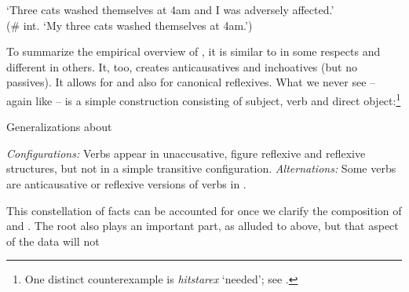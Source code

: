 \begin{exe}
\begin{xlist}
\begin{xlist}
\begin{exe}
\begin{xlist}
\begin{xlist}
\begin{exe}
\begin{xlist}
\begin{xlist}
\begin{exe}
\begin{exe}
\begin{xlist}
\begin{exe}
\begin{exe}
\begin{xlist}
\begin{exe}
\begin{exe}
\begin{exe}
\begin{exe}
\begin{exe}
\begin{xlist}
\begin{exe}
\begin{xlist}
\begin{exe}
\begin{exe}
\begin{xlist}
\begin{exe}
\begin{xlist}
\begin{exe}
\begin{xlist}
\begin{exe}
\begin{exe}
\begin{exe}
\begin{xlist}
\begin{exe}
\begin{exe}
\begin{exe}
\begin{xlist}
\begin{exe}
\begin{xlist}
\begin{exe}
\begin{xlist}
\begin{exe}
\begin{xlist}
\begin{exe}
\begin{exe}
\begin{exe}
\begin{exe}
\begin{xlist}
\begin{exe}
\begin{xlist}
\begin{exe}
\begin{xlist}
\begin{exe}
\begin{xlist}
\begin{exe}
\begin{xlist}
\begin{exe}
\begin{xlist}
\begin{exe}
\begin{exe}
\begin{exe}
\begin{exe}
\begin{xlist}
\begin{exe}
\begin{xlist}
\begin{exe}
\begin{xlist}
\begin{exe}
\begin{exe}
\begin{xlist}
\begin{exe}
\begin{xlist}
\begin{exe}
\begin{exe}
\begin{exe}
\begin{exe}
\begin{xlist}
\begin{xlist}
\begin{exe}
\begin{xlist}
\begin{exe}
\begin{exe}
\begin{exe}
\begin{xlist}
\begin{exe}
\begin{exe}
\begin{xlist}
\begin{exe}
\begin{exe}
\begin{exe}
\begin{xlist}
\begin{xlist}
\begin{exe}
\begin{xlist}
\begin{exe}
\begin{exe}
\begin{exe}
{	\glt `Three cats washed themselves at 4am and I was adversely affected.'\\
		(\# int. `My three cats washed themselves at 4am.')
	}

	
 \z 

To summarize the empirical overview of {\thit}, it is similar to {\tnif} in some respects and different in others. It, too, creates anticausatives and inchoatives (but no passives). It allows for  and also for canonical reflexives. What we never see -- again like {\tnif} -- is a simple  construction consisting of subject, verb and direct object:\footnote{One distinct counterexample is \emph{hitstarex} `needed'; see \citet[130ff16]{harveskayne12}.}

 \begin{exe}
 \ex  \label{ex:gen-thit}Generalizations about {\thit}
 \begin{xlist} 
 	\ex  \textit{Configurations:} Verbs appear in unaccusative, figure reflexive and reflexive structures, but not in a simple transitive configuration. 
 	\ex  \textit{Alternations:} Some verbs are anticausative or reflexive versions of verbs in {\tpie}. 
 \z
\z 

This constellation of facts can be accounted for once we clarify the composition of {\va} and {\vz}. The root also plays an important part, as alluded to above, but that aspect of the data will not 
\end{xlist}
\end{exe}
\end{exe}
\end{exe}
\end{exe}
\end{xlist}
\end{exe}
\end{xlist}
\end{xlist}
\end{exe}
\end{exe}
\end{exe}
\end{xlist}
\end{exe}
\end{exe}
\end{xlist}
\end{exe}
\end{exe}
\end{exe}
\end{xlist}
\end{exe}
\end{xlist}
\end{xlist}
\end{exe}
\end{exe}
\end{exe}
\end{exe}
\end{xlist}
\end{exe}
\end{xlist}
\end{exe}
\end{exe}
\end{xlist}
\end{exe}
\end{xlist}
\end{exe}
\end{xlist}
\end{exe}
\end{exe}
\end{exe}
\end{exe}
\end{xlist}
\end{exe}
\end{xlist}
\end{exe}
\end{xlist}
\end{exe}
\end{xlist}
\end{exe}
\end{xlist}
\end{exe}
\end{xlist}
\end{exe}
\end{exe}
\end{exe}
\end{exe}
\end{xlist}
\end{exe}
\end{xlist}
\end{exe}
\end{xlist}
\end{exe}
\end{xlist}
\end{exe}
\end{exe}
\end{exe}
\end{xlist}
\end{exe}
\end{exe}
\end{exe}
\end{xlist}
\end{exe}
\end{xlist}
\end{exe}
\end{xlist}
\end{exe}
\end{exe}
\end{xlist}
\end{exe}
\end{xlist}
\end{exe}
\end{exe}
\end{exe}
\end{exe}
\end{exe}
\end{xlist}
\end{exe}
\end{exe}
\end{xlist}
\end{exe}
\end{exe}
\end{xlist}
\end{xlist}
\end{exe}
\end{xlist}
\end{xlist}
\end{exe}
\end{xlist}
\end{xlist}
\end{exe}
